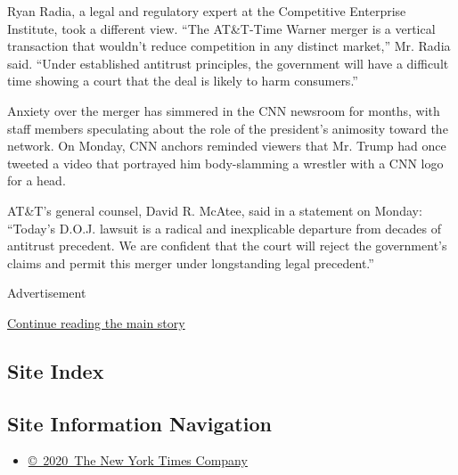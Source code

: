 Ryan Radia, a legal and regulatory expert at the Competitive Enterprise
Institute, took a different view. ``The AT\&T-Time Warner merger is a
vertical transaction that wouldn't reduce competition in any distinct
market,'' Mr. Radia said. ``Under established antitrust principles, the
government will have a difficult time showing a court that the deal is
likely to harm consumers.''

Anxiety over the merger has simmered in the CNN newsroom for months,
with staff members speculating about the role of the president's
animosity toward the network. On Monday, CNN anchors reminded viewers
that Mr. Trump had once tweeted a video that portrayed him body-slamming
a wrestler with a CNN logo for a head.

AT\&T's general counsel, David R. McAtee, said in a statement on Monday:
``Today's D.O.J. lawsuit is a radical and inexplicable departure from
decades of antitrust precedent. We are confident that the court will
reject the government's claims and permit this merger under longstanding
legal precedent.''

Advertisement

\protect\hyperlink{after-bottom}{Continue reading the main story}

\hypertarget{site-index}{%
\subsection{Site Index}\label{site-index}}

\hypertarget{site-information-navigation}{%
\subsection{Site Information
Navigation}\label{site-information-navigation}}

\begin{itemize}
\tightlist
\item
  \href{https://help.nytimes3xbfgragh.onion/hc/en-us/articles/115014792127-Copyright-notice}{©~2020~The
  New York Times Company}
\end{itemize}

